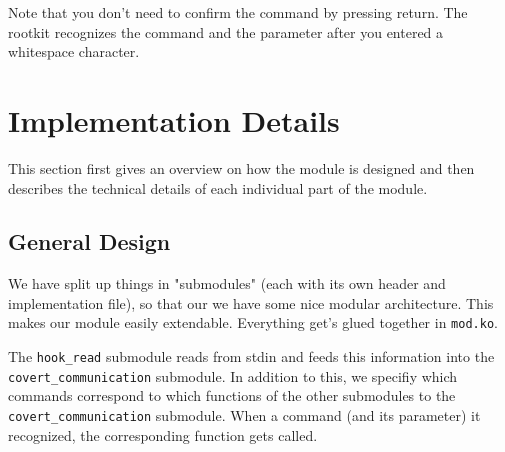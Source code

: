 \documentclass[10pt, letterpaper]{article}
\begin{document}
Note that you don't need to confirm the command by pressing return. The rootkit recognizes the command and the parameter after you entered a whitespace character.

\section{Implementation Details}
This section first gives an overview on how the module is designed and then describes the technical details of each individual part of the module.
\subsection{General Design}
We have split up things in "submodules" (each with its own header and implementation file), so
that our we have some nice modular architecture. This makes our module easily extendable. Everything get's glued together in \texttt{mod.ko}.

The \texttt{hook\_read} submodule reads from stdin and feeds this information into the \linebreak \texttt{covert\_communication} submodule. In addition to this, we specifiy which commands correspond to which functions of the other submodules to the  \texttt{covert\_communication} submodule. When a command (and its parameter) it recognized, the corresponding function gets called.
\end{document}
